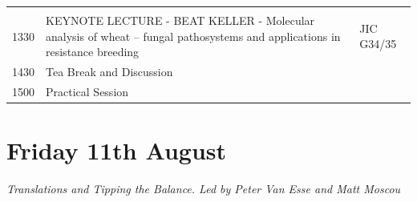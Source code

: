 \documentclass[12pt,]{book}
\theoremstyle{definition}
\theoremstyle{definition}
\theoremstyle{remark}
\begin{document}
\begin{longtable}[]{@{}lll@{}}
\begin{minipage}[t]{0.13\columnwidth}
\end{minipage}\tabularnewline
\begin{minipage}[t]{0.09\columnwidth}\raggedright\strut
1330\strut
\end{minipage} & \begin{minipage}[t]{0.38\columnwidth}\raggedright\strut
KEYNOTE LECTURE - BEAT KELLER - Molecular analysis of wheat -- fungal
pathosystems and applications in resistance breeding\strut
\end{minipage} & \begin{minipage}[t]{0.13\columnwidth}\raggedright\strut
JIC G34/35\strut
\end{minipage}\tabularnewline
\begin{minipage}[t]{0.09\columnwidth}\raggedright\strut
1430\strut
\end{minipage} & \begin{minipage}[t]{0.38\columnwidth}\raggedright\strut
Tea Break and Discussion\strut
\end{minipage} & \begin{minipage}[t]{0.13\columnwidth}\raggedright\strut
\strut
\end{minipage}\tabularnewline
\begin{minipage}[t]{0.09\columnwidth}\raggedright\strut
1500\strut
\end{minipage} & \begin{minipage}[t]{0.38\columnwidth}\raggedright\strut
Practical Session\strut
\end{minipage} & \begin{minipage}[t]{0.13\columnwidth}\raggedright\strut
\strut
\end{minipage}\tabularnewline
\bottomrule
\end{longtable}

\section*{Friday 11th August}\label{friday-11th-august}

\emph{Translations and Tipping the Balance. Led by Peter Van Esse and
Matt Moscou}
\end{document}
